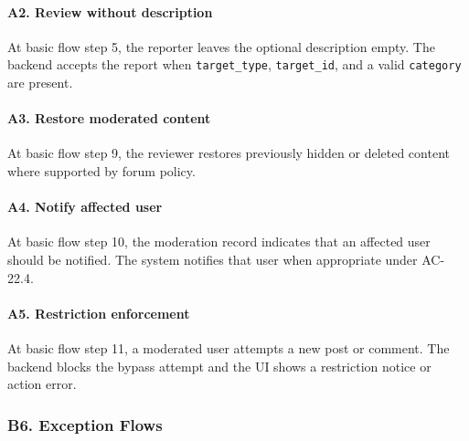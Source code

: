 \documentclass[12pt]{article}
\begin{document}
\hypertarget{sec:a2-review-without-description}{}
\paragraph*{A2. Review without description}
\par\medskip

At basic flow step 5, the reporter leaves the optional description empty. The backend accepts the report when \texttt{target\_type}, \texttt{target\_id}, and a valid \texttt{category} are present.
\par\medskip

\hypertarget{sec:a3-restore-moderated-content}{}
\paragraph*{A3. Restore moderated content}
\par\medskip

At basic flow step 9, the reviewer restores previously hidden or deleted content where supported by forum policy.
\par\medskip

\hypertarget{sec:a4-notify-affected-user}{}
\paragraph*{A4. Notify affected user}
\par\medskip

At basic flow step 10, the moderation record indicates that an affected user should be notified. The system notifies that user when appropriate under AC-22.4.
\par\medskip

\hypertarget{sec:a5-restriction-enforcement}{}
\paragraph*{A5. Restriction enforcement}
\par\medskip

At basic flow step 11, a moderated user attempts a new post or comment. The backend blocks the bypass attempt and the UI shows a restriction notice or action error.
\par\medskip

\hypertarget{sec:b6-exception-flows}{}
\subsubsection*{B6. Exception Flows}
\par\medskip
\end{document}
